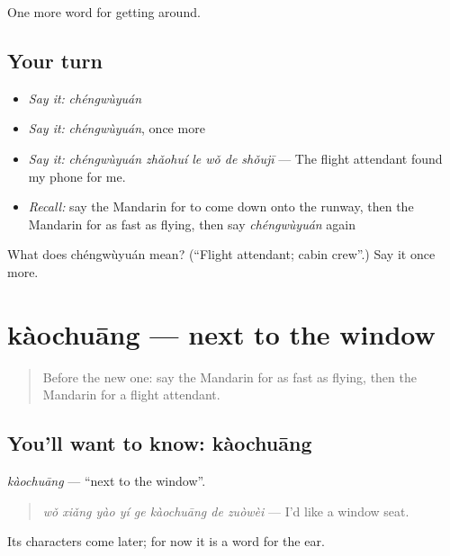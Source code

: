 \begin{grammarlens}[title={What you've built}]
One more word for getting around.
\end{grammarlens}

\subsection*{Your turn}
\begin{itemize}
\raggedright
  \item \emph{Say it:} \emph{chéngwùyuán}
  \item \emph{Say it:} \emph{chéngwùyuán}, once more
  \item \emph{Say it:} \emph{chéngwùyuán zhǎohuí le wǒ de shǒujī} — The flight attendant found my phone for me.
  \item \emph{Recall:} say the Mandarin for to come down onto the runway, then the Mandarin for as fast as flying, then say \emph{chéngwùyuán} again
\end{itemize}

\begin{tcolorbox}[breakable,colback=teal!4,colframe=teal!35!black,title={Before you move on}]
What does chéngwùyuán mean? (\textquotedblleft{}Flight attendant; cabin crew\textquotedblright{}.) Say it once more.
\end{tcolorbox}
\section[kàochuāng]{kàochuāng — next to the window}

\label{lesson:ZH-C414-kaochuang}



\begin{quote}
Before the new one: say the Mandarin for as fast as flying, then the Mandarin for a flight attendant.
\end{quote}

\subsection*{You'll want to know: kàochuāng}
\emph{kàochuāng} — \textquotedblleft{}next to the window\textquotedblright{}.

\begin{quote}
\emph{wǒ xiǎng yào yí ge kàochuāng de zuòwèi} — I'd like a window seat.
\end{quote}

Its characters come later; for now it is a word for the ear.

